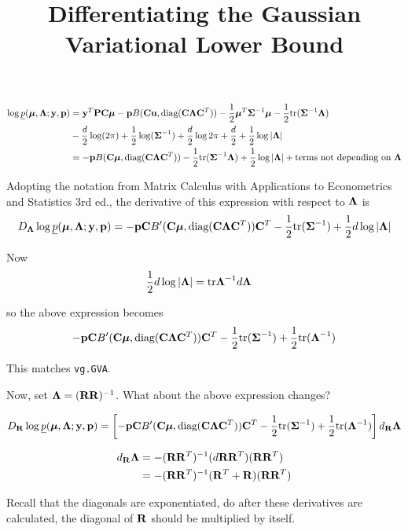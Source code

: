\documentclass{article}[12pt]
\title{Differentiating the Gaussian Variational Lower Bound}
\begin{document}
\begin{align*}
\log \underline{p}({\boldsymbol \mu}, {\boldsymbol \Lambda}; {\bf y}, {\bf p}) &= {\bf y}^T {\bf P} {\bf C} {\boldsymbol \mu} - {\bf p} B({\bf C} {\bf u}, \text{diag}{({\bf C}{\boldsymbol\Lambda}{\bf C}^T)}) - {\frac{1}{2}} {\boldsymbol \mu}^T {\boldsymbol \Sigma}^{-1} {\boldsymbol \mu} - {\frac{1}{2}} \text{tr}{({\boldsymbol\Sigma}^{-1} {\boldsymbol\Lambda})} \\
&- \frac{d}{2} \log(2 \pi) + {\frac{1}{2}} \log({\boldsymbol \Sigma}^{-1}) + \frac{d}{2} \log{2 \pi} + \frac{d}{2} + {\frac{1}{2}} \log |{\boldsymbol \Lambda}| \\
&= -{\bf p} B({\bf C} {\boldsymbol \mu}, \text{diag}{({\bf C}{\boldsymbol\Lambda}{\bf C}^T)}) - {\frac{1}{2}} \text{tr}{({\boldsymbol\Sigma}^{-1} {\boldsymbol\Lambda})} + {\frac{1}{2}} \log |{\boldsymbol \Lambda}| + \text{terms not depending on ${\boldsymbol \Lambda}$}
\end{align*}

Adopting the notation from Matrix Calculus with Applications to Econometrics and 
Statistics 3rd ed., the derivative of this expression with respect to ${\boldsymbol \Lambda}$ is
\[
D_{\boldsymbol \Lambda} \log \underline{p}({\boldsymbol \mu}, {\boldsymbol \Lambda}; {\bf y}, {\bf p}) = -{\bf p} {\bf C} B'({\bf C} {\boldsymbol \mu}, \text{diag}{({\bf C}{\boldsymbol\Lambda}{\bf C}^T)}) {\bf C}^T - {\frac{1}{2}} \text{tr}{({\boldsymbol\Sigma}^{-1})} + {\frac{1}{2}} d \log |{\boldsymbol \Lambda}|
\]

Now
\begin{align*}
{\frac{1}{2}} d \log |{\boldsymbol \Lambda}| &= \text{tr} {\boldsymbol\Lambda}^{-1} d {\boldsymbol \Lambda}
\end{align*}

so the above expression becomes
\begin{align*}
 -{\bf p} {\bf C} B'({\bf C} {\boldsymbol \mu}, \text{diag}{({\bf C}{\boldsymbol\Lambda}{\bf C}^T)}) {\bf C}^T - {\frac{1}{2}} \text{tr}{({\boldsymbol\Sigma}^{-1})} + {\frac{1}{2}} \text{tr}{({\boldsymbol\Lambda}^{-1})}
\end{align*}

This matches \texttt{vg.GVA}.

Now, set ${\boldsymbol \Lambda} = ({\bf R} {\bf R})^{-1}$. What about the above expression changes?

\[
D_{\bf R} \log \underline{p}({\boldsymbol \mu}, {\boldsymbol \Lambda}; {\bf y}, {\bf p}) = \left [ -{\bf p} {\bf C} B'({\bf C} {\boldsymbol \mu}, \text{diag}{({\bf C}{\boldsymbol\Lambda}{\bf C}^T)}) {\bf C}^T - {\frac{1}{2}} \text{tr}{({\boldsymbol\Sigma}^{-1})} + {\frac{1}{2}} \text{tr}{({\boldsymbol\Lambda}^{-1})} \right ] d_{\bf R} {\boldsymbol \Lambda}
\]

\begin{align*}
d_{\bf R} {\boldsymbol \Lambda} &= -({\bf R} {\bf R}^T)^{-1} (d{\bf R} {\bf R}^T) ({\bf R} {\bf R}^T) \\
&=-({\bf R} {\bf R}^T)^{-1} ({\bf R}^T + {\bf R}) ({\bf R} {\bf R}^T) \\
\end{align*}

Recall that the diagonals are exponentiated, do after these derivatives are calculated, the
diagonal of ${\bf R}$ should be multiplied by itself.
\end{document}
